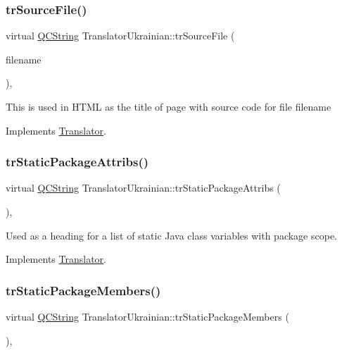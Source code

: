 \subsubsection{\texorpdfstring{trSourceFile()}{trSourceFile()}}
{\footnotesize\ttfamily virtual \mbox{\hyperlink{class_q_c_string}{Q\+C\+String}} Translator\+Ukrainian\+::tr\+Source\+File (\begin{DoxyParamCaption}\item[{\mbox{\hyperlink{class_q_c_string}{Q\+C\+String}} \&}]{filename }\end{DoxyParamCaption})\hspace{0.3cm}{\ttfamily [inline]}, {\ttfamily [virtual]}}

This is used in H\+T\+ML as the title of page with source code for file filename 

Implements \mbox{\hyperlink{class_translator}{Translator}}.

\mbox{\label{class_translator_ukrainian_a11cff1b74bf31bf16b2eea15bc9f5b87}} 
\subsubsection{\texorpdfstring{trStaticPackageAttribs()}{trStaticPackageAttribs()}}
{\footnotesize\ttfamily virtual \mbox{\hyperlink{class_q_c_string}{Q\+C\+String}} Translator\+Ukrainian\+::tr\+Static\+Package\+Attribs (\begin{DoxyParamCaption}{ }\end{DoxyParamCaption})\hspace{0.3cm}{\ttfamily [inline]}, {\ttfamily [virtual]}}

Used as a heading for a list of static Java class variables with package scope. 

Implements \mbox{\hyperlink{class_translator}{Translator}}.

\mbox{\label{class_translator_ukrainian_a949dc9d609574dfd90bfc21bf481b71d}} 
\subsubsection{\texorpdfstring{trStaticPackageMembers()}{trStaticPackageMembers()}}
{\footnotesize\ttfamily virtual \mbox{\hyperlink{class_q_c_string}{Q\+C\+String}} Translator\+Ukrainian\+::tr\+Static\+Package\+Members (\begin{DoxyParamCaption}{ }\end{DoxyParamCaption})\hspace{0.3cm}{\ttfamily [inline]}, {\ttfamily [virtual]}}

